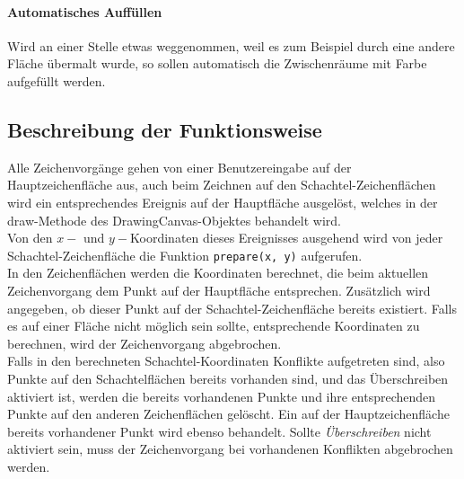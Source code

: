 \paragraph{Automatisches Auffüllen}
Wird an einer Stelle etwas weggenommen, weil es zum Beispiel durch eine andere Fläche übermalt wurde, so sollen automatisch die Zwischenräume mit Farbe aufgefüllt werden.

\subsection{Beschreibung der Funktionsweise}
\label{subsec:funktionsweise}

Alle Zeichenvorgänge gehen von einer Benutzereingabe auf der Hauptzeichenfläche aus, auch beim Zeichnen auf den Schachtel-Zeichenflächen wird ein entsprechendes Ereignis auf der Hauptfläche ausgelöst, welches in der draw-Methode des DrawingCanvas-Objektes behandelt wird.\\

Von den $x - $ und $y - $Koordinaten dieses Ereignisses ausgehend wird von jeder Schachtel-Zeichenfläche die Funktion \texttt{prepare(x, y)} aufgerufen.\\

In den Zeichenflächen werden die Koordinaten berechnet, die beim aktuellen Zeichenvorgang dem Punkt auf der Hauptfläche entsprechen. Zusätzlich wird angegeben, ob dieser Punkt auf der Schachtel-Zeichenfläche bereits existiert. Falls es auf einer Fläche nicht möglich sein sollte, entsprechende Koordinaten zu berechnen, wird der Zeichenvorgang abgebrochen.\\

Falls in den berechneten Schachtel-Koordinaten Konflikte aufgetreten sind, also Punkte auf den Schachtelflächen bereits vorhanden sind, und das Überschreiben aktiviert ist, werden die bereits vorhandenen Punkte und ihre entsprechenden Punkte auf den anderen Zeichenflächen gelöscht. Ein auf der Hauptzeichenfläche bereits vorhandener Punkt wird ebenso behandelt. Sollte \emph{Überschreiben} nicht aktiviert sein, muss der Zeichenvorgang bei vorhandenen Konflikten abgebrochen werden.\\

